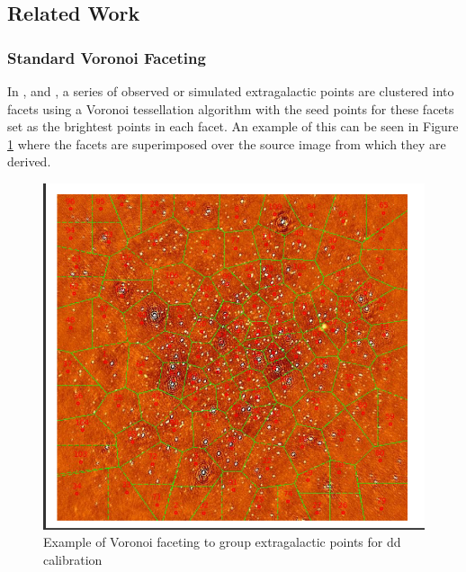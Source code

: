 \subsection{Related Work}\label{ra:sec:rw}
%
\subsubsection{Standard Voronoi Faceting}\label{ra:ssec:svf}
In \citet{tasse2014applying}, \citet{smirnov2015radio} and \citet{van2016lofar}, a series of observed or simulated extragalactic points are clustered into facets using a Voronoi tessellation algorithm with the seed points for these facets set as the brightest points in each facet. An example of this can be seen in Figure \ref{tes:fig:stelvor} where the facets are superimposed over the source image from which they are derived.
%
\begin{figure}[H]
    \centering
    \includegraphics[scale=0.4]{Images/tessellation.png}
    \caption{Example of Voronoi faceting to group extragalactic points for \gls{dd} calibration}
    \label{tes:fig:stelvor}
\end{figure}
